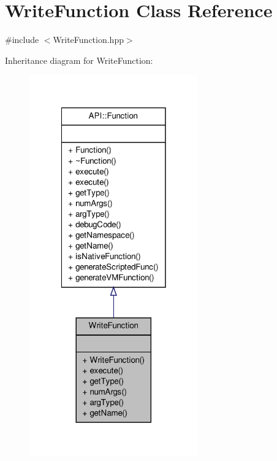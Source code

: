 \hypertarget{class_write_function}{\section{Write\-Function Class Reference}
\label{class_write_function}
}


{\ttfamily \#include $<$Write\-Function.\-hpp$>$}



Inheritance diagram for Write\-Function\-:
\nopagebreak
\begin{figure}[H]
\begin{center}
\leavevmode
\includegraphics[width=206pt]{class_write_function__inherit__graph}
\end{center}
\end{figure}



